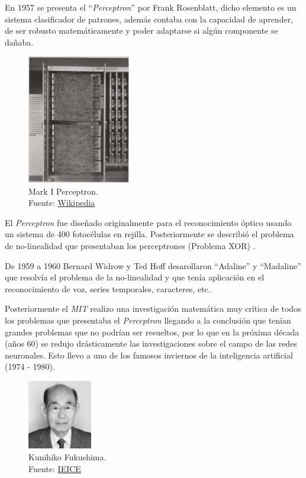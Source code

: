 En 1957 se presenta el ``\textit{Perceptron}'' por {Frank Rosenblatt}, dicho elemento es un sistema clasificador de patrones, además contaba con la capacidad de aprender, de ser robusto matemáticamente y poder adaptarse si algún componente se dañaba.

\begin{figure}[H]
  \centering
  \includegraphics[width=0.4\textwidth]{figures/perceptron.png}
  \caption{Mark I Perceptron. \\Fuente: \href{https://en.wikipedia.org/wiki/Perceptron}{Wikipedia}}
  \label{fig:perceptron}
\end{figure}

El \textit{Perceptron} fue diseñado originalmente para el reconocimiento óptico usando un sistema de 400 fotocélulas en rejilla.
Posteriormente se describió el problema de no-linealidad que presentaban los perceptrones (Problema XOR) \cite{cuevastello2018apuntes}.

De 1959 a 1960 {Bernard Widrow} y {Ted Hoff} desarollaron ``Adaline'' y ``Madaline'' \cite{widrow1960adaptive} que resolvía el problema de la no-linealidad y que tenía aplicación en el reconocimiento de voz, series temporales, caracteres, etc.

Posteriormente el \textit{MIT} realizo una investigación matemática muy crítica de todos los problemas que presentaba el \textit{Perceptron} llegando a la conclusión que tenían grandes problemas que no podrían ser resueltos, por lo que en la próxima década (años 60) se redujo drásticamente las investigaciones sobre el campo de las redes neuronales.
Esto llevo a uno de los famosos inviernos de la inteligencia artificial (1974 - 1980).

\begin{figure}[H]
  \centering
  \includegraphics[width=0.25\textwidth]{figures/Kunihiko Fukushima.jpg}
  \caption{Kunihiko Fukushima. \\Fuente: \href{https://www.ieice.org/eng/about_ieice/new_honorary_members_award_winners/2017/meiyo_05e.html}{IEICE}}
  \label{fig:kunihiko-fukushima}
\end{figure}


